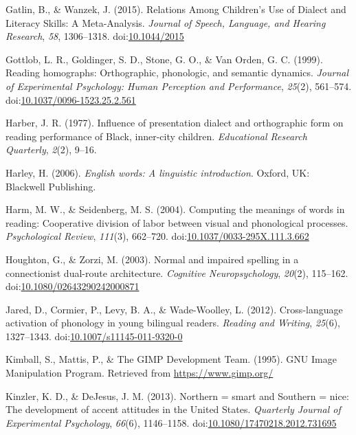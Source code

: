 \documentclass[doc,floatsintext]{apa6}
\begin{document}
\hypertarget{ref-Gatlin2015}{}
Gatlin, B., \& Wanzek, J. (2015). Relations Among Children's Use of
Dialect and Literacy Skills: A Meta-Analysis. \emph{Journal of Speech,
Language, and Hearing Research}, \emph{58}, 1306--1318.
doi:\href{https://doi.org/10.1044/2015}{10.1044/2015}

\hypertarget{ref-Gottlob1999}{}
Gottlob, L. R., Goldinger, S. D., Stone, G. O., \& Van Orden, G. C.
(1999). Reading homographs: Orthographic, phonologic, and semantic
dynamics. \emph{Journal of Experimental Psychology: Human Perception and
Performance}, \emph{25}(2), 561--574.
doi:\href{https://doi.org/10.1037/0096-1523.25.2.561}{10.1037/0096-1523.25.2.561}

\hypertarget{ref-Harber1977}{}
Harber, J. R. (1977). Influence of presentation dialect and orthographic
form on reading performance of Black, inner-city children.
\emph{Educational Research Quarterly}, \emph{2}(2), 9--16.

\hypertarget{ref-Harley2006}{}
Harley, H. (2006). \emph{English words: A linguistic introduction}.
Oxford, UK: Blackwell Publishing.

\hypertarget{ref-Harm2004}{}
Harm, M. W., \& Seidenberg, M. S. (2004). Computing the meanings of
words in reading: Cooperative division of labor between visual and
phonological processes. \emph{Psychological Review}, \emph{111}(3),
662--720.
doi:\href{https://doi.org/10.1037/0033-295X.111.3.662}{10.1037/0033-295X.111.3.662}

\hypertarget{ref-Houghton2003}{}
Houghton, G., \& Zorzi, M. (2003). Normal and impaired spelling in a
connectionist dual-route architecture. \emph{Cognitive Neuropsychology},
\emph{20}(2), 115--162.
doi:\href{https://doi.org/10.1080/02643290242000871}{10.1080/02643290242000871}

\hypertarget{ref-Jared2012}{}
Jared, D., Cormier, P., Levy, B. A., \& Wade-Woolley, L. (2012).
Cross-language activation of phonology in young bilingual readers.
\emph{Reading and Writing}, \emph{25}(6), 1327--1343.
doi:\href{https://doi.org/10.1007/s11145-011-9320-0}{10.1007/s11145-011-9320-0}

\hypertarget{ref-GIMP1995}{}
Kimball, S., Mattis, P., \& The GIMP Development Team. (1995). GNU Image
Manipulation Program. Retrieved from \url{https://www.gimp.org/}

\hypertarget{ref-Kinzler2013}{}
Kinzler, K. D., \& DeJesus, J. M. (2013). Northern = smart and Southern
= nice: The development of accent attitudes in the United States.
\emph{Quarterly Journal of Experimental Psychology}, \emph{66}(6),
1146--1158.
doi:\href{https://doi.org/10.1080/17470218.2012.731695}{10.1080/17470218.2012.731695}
\end{document}

